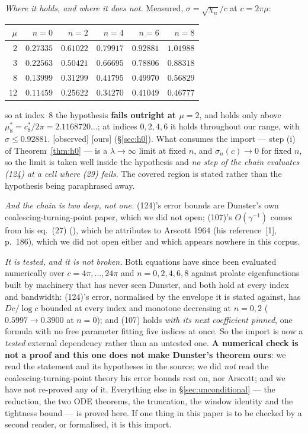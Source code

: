 \documentclass[11pt,a4paper]{article}
\theoremstyle{plain}
\theoremstyle{definition}
\theoremstyle{remark}
\newcommand{\st}[1]{{\normalfont\sffamily\footnotesize[#1]}}
\newcommand{\observed}{\st{observed}}
\newcommand{\ours}{{\normalfont\sffamily\footnotesize[ours]}}
\newcommand{\file}[1]{\path{#1}}
\begin{document}
\emph{Where it holds, and where it does not.}  Measured, $\sigma=\sqrt{\chi_n}/c$
at $c=2\pi\mu$:
\begin{center}\small
\begin{tabular}{@{}rrrrrr@{}}
\hline
$\mu$ & $n=0$ & $n=2$ & $n=4$ & $n=6$ & $n=8$ \\
\hline
$2$ & $0.27335$ & $0.61022$ & $0.79917$ & $0.92881$ & $\mathbf{1.01988}$ \\
$3$ & $0.22563$ & $0.50421$ & $0.66695$ & $0.78806$ & $0.88318$ \\
$8$ & $0.13999$ & $0.31299$ & $0.41795$ & $0.49970$ & $0.56829$ \\
$12$ & $0.11459$ & $0.25622$ & $0.34270$ & $0.41049$ & $0.46777$ \\
\hline
\end{tabular}
\end{center}
\noindent so at index~$8$ the hypothesis \textbf{fails outright at $\mu=2$}, and
holds only above $\mu^*_8=c^*_8/2\pi=2.1168720\ldots$; at indices $0,2,4,6$ it
holds throughout our range, with $\sigma\le0.92881$.  \observed{} \ours{}
(\S\ref{sec:h0}).  What consumes the import --- step (i) of
Theorem~\ref{thm:h0} --- is a $\lambda\to\infty$ limit at fixed $n$, and
$\sigma_n(c)\to0$ for fixed $n$, so the limit is taken well inside the
hypothesis and \emph{no step of the chain evaluates (124) at a cell where (29)
fails}.  The covered region is stated rather than the hypothesis being
paraphrased away.

\emph{And the chain is two deep, not one.}  (124)'s error bounds are Dunster's
own coalescing-turning-point paper, which we did not open; (107)'s
$O(\gamma^{-1})$ comes from his eq.~(27) (\file{PSWF_JCA.tex:455}), which he
attributes to Arscott 1964 (his reference~[1], p.~186), which we did not open
either and which appears nowhere in this corpus.

\emph{It is tested, and it is not broken.}  Both equations have since been
evaluated numerically over $c=4\pi,\dots,24\pi$ and $n=0,2,4,6,8$ against
prolate eigenfunctions built by machinery that has never seen Dunster, and both
hold at every index and bandwidth: (124)'s error, normalised by the envelope it
is stated against, has $Dc/\log c$ bounded at every index and monotone
decreasing at $n=0,2$ ($0.5997\to0.3900$ at $n=0$); and (107) holds \emph{with
its next coefficient pinned}, one formula with no free parameter fitting five
indices at once.  So the import is now a \emph{tested} external dependency
rather than an untested one.  \textbf{A numerical check is not a proof and this
one does not make Dunster's theorem ours}: we read the statement and its
hypotheses in the source; we did \emph{not} read the coalescing-turning-point
theory his error bounds rest on, nor Arscott; and we have not re-proved any of
it.  Everything else in
\S\ref{sec:unconditional} --- the reduction, the two ODE theorems, the
truncation, the window identity and the tightness bound --- is proved here.  If
one thing in this paper is to be checked by a second reader, or formalised, it
is this import.
\end{document}

